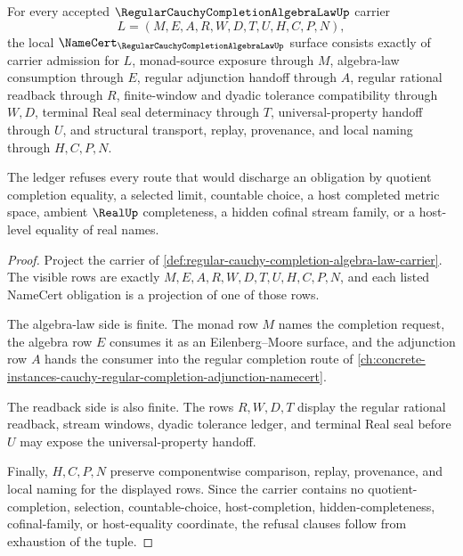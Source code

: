 \begin{theorem}
\label{thm:regular-cauchy-completion-algebra-law-namecert-obligations}
For every accepted $\RegularCauchyCompletionAlgebraLawUp$ carrier
$$
L=(M,E,A,R,W,D,T,U,H,C,P,N),
$$
the local $\NameCert_{\RegularCauchyCompletionAlgebraLawUp}$ surface consists exactly of carrier admission for $L$, monad-source exposure through $M$, algebra-law consumption through $E$, regular adjunction handoff through $A$, regular rational readback through $R$, finite-window and dyadic tolerance compatibility through $W,D$, terminal Real seal determinacy through $T$, universal-property handoff through $U$, and structural transport, replay, provenance, and local naming through $H,C,P,N$.

The ledger refuses every route that would discharge an obligation by quotient completion equality, a selected limit, countable choice, a host completed metric space, ambient $\RealUp$ completeness, a hidden cofinal stream family, or a host-level equality of real names.
\end{theorem}
\begin{proof}
Project the carrier of \autoref{def:regular-cauchy-completion-algebra-law-carrier}. The visible rows are exactly $M,E,A,R,W,D,T,U,H,C,P,N$, and each listed NameCert obligation is a projection of one of those rows.

The algebra-law side is finite. The monad row $M$ names the completion request, the algebra row $E$ consumes it as an Eilenberg--Moore surface, and the adjunction row $A$ hands the consumer into the regular completion route of \autoref{ch:concrete-instances-cauchy-regular-completion-adjunction-namecert}.

The readback side is also finite. The rows $R,W,D,T$ display the regular rational readback, stream windows, dyadic tolerance ledger, and terminal Real seal before $U$ may expose the universal-property handoff.

Finally, $H,C,P,N$ preserve componentwise comparison, replay, provenance, and local naming for the displayed rows. Since the carrier contains no quotient-completion, selection, countable-choice, host-completion, hidden-completeness, cofinal-family, or host-equality coordinate, the refusal clauses follow from exhaustion of the tuple.
\end{proof}

